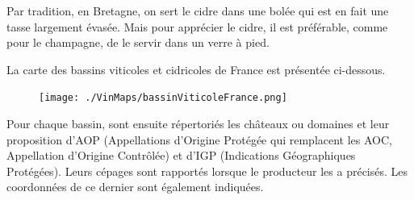Par tradition, en Bretagne, on sert le cidre dans une bolée qui est en fait une tasse largement évasée. Mais pour apprécier le cidre, il est préférable, comme pour le champagne, de le servir dans un verre à pied.
  
La carte des bassins viticoles et cidricoles de France est présentée ci-dessous.
\begin{figure}[!t]
\texttt{[image: ./VinMaps/bassinViticoleFrance.png]}
\end{figure}
\newpage
Pour chaque bassin, sont ensuite répertoriés les châteaux ou domaines et leur proposition d’AOP (Appellations d’Origine Protégée qui remplacent les AOC, Appellation d’Origine Contrôlée) et d’IGP (Indications Géographiques Protégées). Leurs cépages sont rapportés lorsque le producteur les a précisés. Les coordonnées de ce dernier sont également indiquées.     
